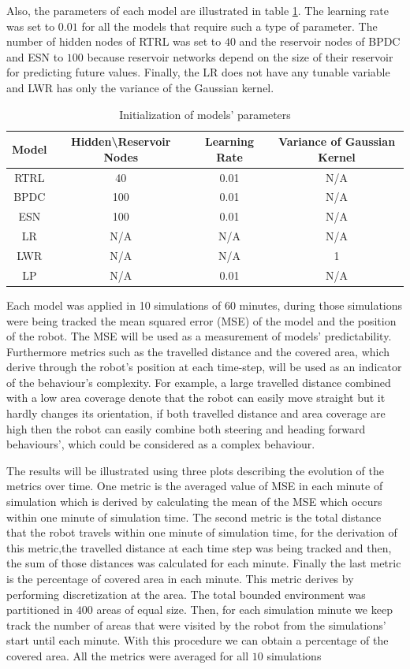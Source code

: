 \documentclass[msc,ai,logo]{infthesis}
\begin{document}
Also, the parameters of each model are illustrated in table \ref{tab:param}. The learning rate was set to $0.01$ for all the models that require such a type of parameter. The number of hidden nodes of RTRL was set to $40$ and the reservoir nodes of BPDC and ESN to $100$ because reservoir networks depend on the size of their reservoir for predicting future values. Finally, the LR does not have any tunable variable and LWR has only the variance of the Gaussian kernel.   

\begin{table}[H]
\centering %
\begin{tabular}{c c c c} %
Model & Hidden\textbackslash Reservoir Nodes & Learning Rate & Variance of Gaussian Kernel \\
\hline
\hline
RTRL & 40 & 0.01 & N/A\\
BPDC & 100 &0.01 & N/A \\
ESN  & 100 &0.01 & N/A\\
LR   & N/A & N/A & N/A \\
LWR  & N/A & N/A & 1\\
LP   & N/A & 0.01 & N/A\\
\hline
\hline
\end{tabular}
\caption{Initialization of models' parameters}
\label{tab:param}
\end{table}

Each model was applied in 10 simulations of 60 minutes, during those simulations were being tracked the mean squared error (MSE) of the model and the position of the robot. The MSE will be used as a measurement of models' predictability. Furthermore metrics such as the travelled distance and the covered area, which derive through the robot's position at each time-step, will be used as an indicator of the behaviour's complexity. For example, 
a large travelled distance combined with a low area coverage denote that the robot can easily move straight but it hardly changes its orientation, if both travelled distance and area coverage are high then the robot can easily combine both steering and heading forward behaviours', which could be considered as a complex behaviour. 

The results will be illustrated using three plots describing the evolution of the metrics over time. One metric is the averaged value of MSE in each minute of simulation which is derived by calculating the mean of the MSE which occurs within one minute of simulation time.  The second metric is the total distance that the robot travels within one minute of simulation time, for the derivation of this metric,the travelled distance at each time step was being tracked and then, the sum of those distances was calculated for each minute. Finally the last metric is the percentage of covered area in each minute. This metric derives by performing discretization at the area. The total bounded environment was partitioned in $400$ areas of equal size. Then, for each simulation minute we keep track the number of areas that were visited by the robot from the simulations' start until each minute.
With this procedure we can obtain a percentage of the covered area. All the metrics were averaged for all $10$ simulations
\end{document}
